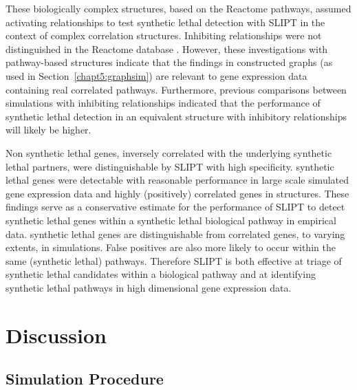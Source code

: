 These biologically complex  structures, based on the Reactome pathways, assumed activating relationships to test \gls{synthetic lethal} detection with \gls{SLIPT} in the context of complex correlation structures. Inhibiting relationships were not distinguished in the Reactome database \citep{Reactome}. However, these investigations with pathway-based  structures indicate that the findings in constructed \glspl{graph} (as used in Section~\ref{chapt5:graphsim}) are relevant to \gls{gene expression} data containing real correlated pathways. Furthermore, previous comparisons between simulations with inhibiting relationships indicated that the performance of \gls{synthetic lethal} detection in an equivalent  structure with inhibitory relationships will likely be higher.

Non synthetic lethal genes, inversely correlated with the underlying \gls{synthetic lethal} partners, were distinguishable by \gls{SLIPT} with high specificity. \Gls{synthetic lethal} genes were detectable with reasonable performance in large scale simulated \gls{gene expression} data and highly (positively) correlated genes in  structures. These findings serve as a conservative estimate for the performance of \gls{SLIPT} to detect \gls{synthetic lethal} genes within a \gls{synthetic lethal} biological pathway in empirical data. \Gls{synthetic lethal} genes are distinguishable from correlated genes, to varying extents, in simulations. False positives are also more likely to occur within the same (synthetic lethal) pathways. Therefore \gls{SLIPT} is both effective at triage of \gls{synthetic lethal} candidates within a biological pathway and at identifying \gls{synthetic lethal} pathways in high dimensional \gls{gene expression} data.


\FloatBarrier

\section{Discussion}

\subsection{Simulation Procedure}

